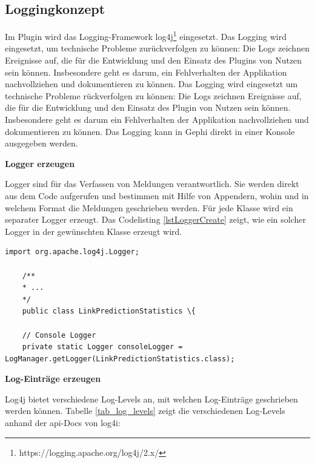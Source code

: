 \subsection{Loggingkonzept}
\label{loggingkonzept}

Im Plugin wird das Logging-Framework log4j\footnote{https://logging.apache.org/log4j/2.x/} eingesetzt.
Das Logging wird eingesetzt, um technische Probleme zurückverfolgen zu können: Die Logs zeichnen Ereignisse auf, die für die Entwicklung und den Einsatz des Plugins von Nutzen sein können.
Insbesondere geht es darum, ein Fehlverhalten der Applikation nachvollziehen und dokumentieren zu können.
Das Logging wird eingesetzt um technische Probleme rückverfolgen zu können: Die Logs zeichnen Ereignisse auf, die für die Entwicklung und den Einsatz des Plugin von Nutzen sein können.
Insbesondere geht es darum ein Fehlverhalten der Applikation nachvollziehen und dokumentieren zu können. Das Logging kann in Gephi direkt in einer Konsole ausgegeben werden.

\textbf{Logger erzeugen}

Logger sind für das Verfassen von Meldungen verantwortlich. Sie werden direkt aus dem Code aufgerufen und bestimmen mit Hilfe von Appendern, wohin und in welchem Format die Meldungen geschrieben werden.
Für jede Klasse wird ein separater Logger erzeugt. Das Codelisting \ref{lstLoggerCreate} zeigt, wie ein solcher Logger in der gewünschten Klasse erzeugt wird.

\begin{lstlisting}[caption={Erzeugen eines Loggers},label=lstLoggerCreate]
    import org.apache.log4j.Logger;

    /**
    * ...
    */
    public class LinkPredictionStatistics \{

    // Console Logger
    private static Logger consoleLogger = LogManager.getLogger(LinkPredictionStatistics.class);
\end{lstlisting}

\textbf{Log-Einträge erzeugen}

Log4j bietet verschiedene Log-Levels an, mit welchen Log-Einträge geschrieben werden können.
Tabelle \ref{tab_log_levels} zeigt die verschiedenen Log-Levels anhand der \acs{api}-Docs von log4i:

